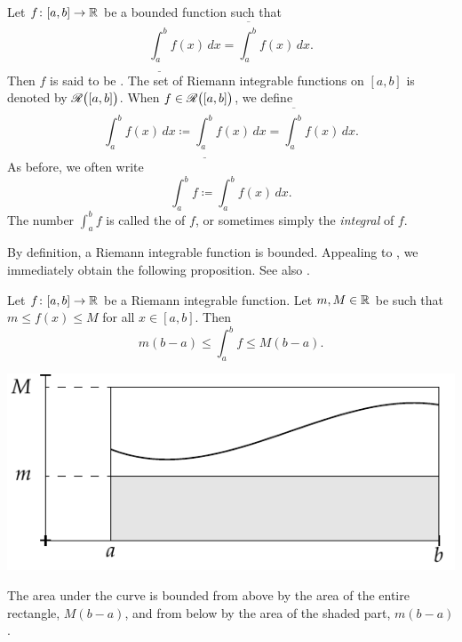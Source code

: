 \begin{defn}
Let $f \colon [a,b] \to {\mathbb{R}}$ be a bounded function such that
\begin{equation*}
\underline{\int_a^b} f(x)\,dx = \overline{\int_a^b} f(x)\,dx .
\end{equation*}
Then $f$ is said to be \emph{}.
The set of Riemann integrable functions on $[a,b]$ is denoted
by ${\mathscr{R}}\bigl([a,b]\bigr)$.
When $f \in {\mathscr{R}}\bigl([a,b]\bigr)$, we define
\begin{equation*}
\int_a^b f(x)\,dx \coloneqq 
\underline{\int_a^b} f(x)\,dx = \overline{\int_a^b} f(x)\,dx .
\end{equation*}
As before, we often write
\begin{equation*}
\int_a^b f \coloneqq \int_a^b f(x)\,dx.
\end{equation*}
The number $\int_a^b f$ is called the \emph{}
of $f$, or sometimes simply the \emph{integral} of $f$.
\end{defn}

By definition, a Riemann integrable function is bounded.
Appealing to , we immediately obtain
the following proposition.  See also .

\begin{prop} \label{intbound:prop}
Let $f \colon [a,b] \to {\mathbb{R}}$ be a Riemann integrable function.
Let $m, M \in {\mathbb{R}}$ be 
such that $m \leq f(x) \leq M$ for all $x \in [a,b]$.  Then
\begin{equation*}
m(b-a) \leq
\int_a^b f
\leq M(b-a) .
\end{equation*}
\end{prop}
\begin{myfigureht}
\includegraphics{figures/integralminmax}
\caption{The area under the curve is bounded from above by
the area of the entire rectangle, $M(b-a)$, and from below by
the area of the shaded part, $m(b-a)$.\label{fig:integralminmax}}
\end{myfigureht}

